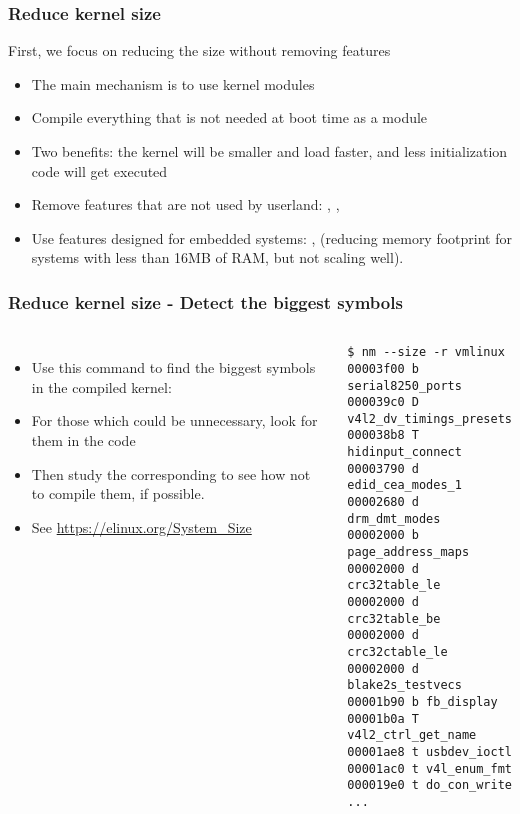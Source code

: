 \begin{frame}
\frametitle{Reduce kernel size}
First, we focus on reducing the size without removing features
\begin{itemize}
        \item The main mechanism is to use kernel modules
        \item Compile everything that is not needed at boot time as a
                module
        \item Two benefits: the kernel will be smaller and load faster, and
                less initialization code will get executed
        \item Remove features that are not used by userland:
                , ,
        \item Use features designed for embedded systems:
              , 
              (reducing memory footprint for systems with less than 16MB
              of RAM, but not scaling well).
\end{itemize}
\end{frame}

\begin{frame}[fragile]
\frametitle{Reduce kernel size - Detect the biggest symbols}
\footnotesize
\begin{columns}
\begin{itemize}
        \item Use this command to find the biggest symbols in the compiled kernel:\\
        \item For those which could be unnecessary, look for them in the code
        \item Then study the corresponding  to see
              how not to compile them, if possible.
        \item See \url{https://elinux.org/System_Size}
\end{itemize}
\begin{block}{}
\begin{verbatim}
$ nm --size -r vmlinux
00003f00 b serial8250_ports
000039c0 D v4l2_dv_timings_presets
000038b8 T hidinput_connect
00003790 d edid_cea_modes_1
00002680 d drm_dmt_modes
00002000 b page_address_maps
00002000 d crc32table_le
00002000 d crc32table_be
00002000 d crc32ctable_le
00002000 d blake2s_testvecs
00001b90 b fb_display
00001b0a T v4l2_ctrl_get_name
00001ae8 t usbdev_ioctl
00001ac0 t v4l_enum_fmt
000019e0 t do_con_write
...
\end{verbatim}
\end{block}
\end{columns}
\end{frame}


